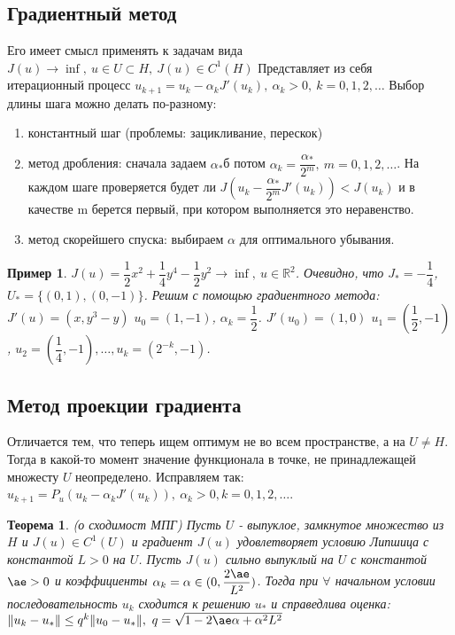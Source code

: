 \documentclass[9pt, a4paper]{extarticle}
\newtheorem*{theorem*}{Теорема}
\newtheorem*{sample}{Пример}
\begin{document}
	\subsection*{Градиентный метод}
		Его имеет смысл применять к задачам вида $J(u) \to \inf, \ u\in U\subset H, \ J(u) \in C^1(H)$\newline
		Представляет из себя итерационный процесс $u_{k+1} = u_k - \alpha_k J'(u_k), \ \alpha_k > 0, \ k = 0, 1, 2, \dots$
		Выбор длины шага можно делать по-разному:
		\begin{enumerate}
			\item константный шаг (проблемы: зацикливание, перескок)
			\item метод дробления: сначала задаем $\alpha_*$б потом $\alpha_k = \dfrac{\alpha_*}{2^m}, \ m = 0, 1, 2, \dots$. На каждом шаге проверяется будет ли $J(u_k - \dfrac{\alpha_*}{2^m}J'(u_k)) < J(u_k)$ и в качестве m берется первый, при котором выполняется это неравенство.
			\item метод скорейшего спуска: выбираем $\alpha$ для оптимального убывания.
		\end{enumerate}
		\begin{sample}
			$J(u) = \dfrac12 x^2 + \dfrac14 y^4 - \dfrac12 y^2 \to \inf, \ u \in \mathbb{R}^2$. Очевидно, что $J_* = - \dfrac14$, $U_* = \{(0,1), (0, -1)\}$. Решим с помощью градиентного метода: $J'(u) = (x, y^3 - y)$\newline
			$u_0 = (1, -1)$, $\alpha_k = \dfrac12$. $J'(u_0) = (1, 0)$ $u_1 = (\dfrac12 , -1)$, $u_2 = (\dfrac14 , -1), \dots, u_k = (2^{-k}, -1)$. 	
		\end{sample}
	\subsection*{Метод проекции градиента}
		Отличается тем, что теперь ищем оптимум не во всем пространстве, а на $U \neq H$. Тогда в какой-то момент значение функционала в точке, не принадлежащей множесту $U$ неопределено. Исправляем так:\newline
		$u_{k+1} = P_u(u_k - \alpha_k J'(u_k)), \ \alpha_k > 0, k =0, 1, 2, \dots$.
		\begin{theorem*}
			(о сходимост МПГ)\newline
			Пусть $U$ - выпуклое, замкнутое множество из $H$ и $J(u) \in C^1(U)$ и градиент $J(u)$ удовлетворяет условию Липшица с константой $L > 0$ на $U$. Пусть $J(u)$ сильно выпуклый на $U$ с константой $\ae >0$ и коэффициенты $\alpha_k  = \alpha \in (0, \dfrac{2\ae}{L^2})$. Тогда при $\forall$ начальном условии последовательность $u_k$ сходится к решению $u_*$ и справедлива оценка: $\|u_k-u_*\| \leq q^k\|u_0 - u_*\|, \ q = \sqrt{1 - 2 \ae\alpha + \alpha^2 L^2}$
		\end{theorem*}
\end{document}
